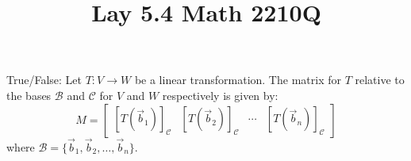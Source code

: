 \documentclass{ximera}
\begin{document}
  	\title{Lay 5.4  \hfill Math 2210Q} 
  	  		    \begin{question} True/False: Let $T:V\to W$ be a linear transformation. The matrix for $T$ relative to the bases $\mathcal{B}$ and $\mathcal{C}$ for $V$ and $W$ respectively is given by:
  	  		    	$$M =\begin{bmatrix} [T(\vec{b}_1)]_{\mathcal{C}}& [T(\vec{b}_2)]_{\mathcal{C}} &\cdots& [T(\vec{b}_n)]_{\mathcal{C}}\end{bmatrix}$$
  	  		    	where $\mathcal{B} = \{\vec{b}_1,\vec{b}_2, \dots, \vec{b}_n  \}$.
  	  		    	
  	  		    	\begin{multipleChoice}
  	  		    	\end{multipleChoice}
  	  		    	
  	  		    \end{question}	
  	  		     
\end{document}
